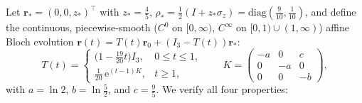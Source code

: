 \documentclass[onecolumn,10pt,notitlepage,amsmath,amssymb,floatfix]{revtex4-2}
\theoremstyle{plain}
\theoremstyle{definition}
\newcommand{\ee}{\mathrm{e}}
\begin{document}
Let $\mathbf{r}_* = (0, 0, z_*)^\top$ with $z_* = \frac{4}{5}$, $\rho_* = \frac{1}{2}(I + z_*\sigma_z) = \mathrm{diag}(\frac{9}{10}, \frac{1}{10})$, and define the continuous, piecewise-smooth ($C^0$ on $[0,\infty)$, $C^\infty$ on $[0,1)\cup(1,\infty)$) affine Bloch evolution $\mathbf{r}(t) = T(t)\mathbf{r}_0 + (I_3 - T(t))\mathbf{r}_*$:
\begin{equation}
\label{eq:S5_level5}
T(t) = \begin{cases}
\big(1 - \frac{19}{20}t\big) I_3, & 0 \le t \le 1, \\[4pt]
\frac{1}{20}\,\ee^{(t-1)K}, & t \ge 1,
\end{cases}
\qquad
K = \begin{pmatrix} -a & 0 & c \\ 0 & -a & 0 \\ 0 & 0 & -b \end{pmatrix},
\end{equation}
with $a = \ln 2$, $b = \ln\frac{5}{2}$, and $c = \frac{9}{5}$. We verify all four properties:
\end{document}
